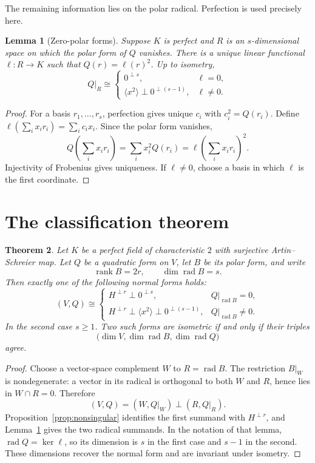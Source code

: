 \documentclass[11pt]{article}
\newtheorem{theorem}{Theorem}[section]
\newtheorem{lemma}[theorem]{Lemma}
\theoremstyle{definition}
\theoremstyle{remark}
\newcommand{\rad}{\operatorname{rad}}
\newcommand{\rank}{\operatorname{rank}}
\begin{document}
The remaining information lies on the polar radical.  Perfection is used
precisely here.

\begin{lemma}[Zero-polar forms]\label{lem:radical}
Suppose $K$ is perfect and $R$ is an $s$-dimensional space on which the polar
form of $Q$ vanishes.  There is a unique linear functional
$\ell:R\to K$ such that $Q(r)=\ell(r)^2$.  Up to isometry,
\[
  Q|_R\cong
  \begin{cases}
    0^{\perp s},&\ell=0,\\
    \langle x^2\rangle\perp0^{\perp(s-1)},&\ell\ne0.
  \end{cases}
\]
\end{lemma}

\begin{proof}
For a basis $r_1,\dots,r_s$, perfection gives unique $c_i$ with
$c_i^2=Q(r_i)$.  Define
$\ell(\sum_i x_i r_i)=\sum_i c_i x_i$.  Since the polar form vanishes,
\[
  Q\left(\sum_i x_i r_i\right)
    =\sum_i x_i^2Q(r_i)
    =\ell\left(\sum_i x_i r_i\right)^2.
\]
Injectivity of Frobenius gives uniqueness.  If $\ell\ne0$, choose a basis in
which $\ell$ is the first coordinate.
\end{proof}

\section{The classification theorem}

\begin{theorem}\label{thm:classification}
Let $K$ be a perfect field of characteristic $2$ with surjective
Artin--Schreier map.  Let $Q$ be a quadratic form on $V$, let $B$ be its
polar form, and write
\[
  \rank B=2r,\qquad \dim\rad B=s.
\]
Then exactly one of the following normal forms holds:
\[
 (V,Q)\cong
 \begin{cases}
  H^{\perp r}\perp0^{\perp s},
    &Q|_{\rad B}=0,\\
  H^{\perp r}\perp\langle x^2\rangle\perp0^{\perp(s-1)},
    &Q|_{\rad B}\ne0.
 \end{cases}
\]
In the second case $s\ge1$.  Two such forms are isometric if and only if
their triples
\[
  \bigl(\dim V,\dim\rad B,\dim\rad Q\bigr)
\]
agree.
\end{theorem}

\begin{proof}
Choose a vector-space complement $W$ to $R=\rad B$.  The restriction
$B|_W$ is nondegenerate: a vector in its radical is orthogonal to both $W$
and $R$, hence lies in $W\cap R=0$.  Therefore
\[
  (V,Q)=(W,Q|_W)\perp(R,Q|_R).
\]
Proposition~\ref{prop:nonsingular} identifies the first summand with
$H^{\perp r}$, and Lemma~\ref{lem:radical} gives the two radical summands.
In the notation of that lemma, $\rad Q=\ker\ell$, so its dimension is $s$
in the first case and $s-1$ in the second.  These dimensions recover the
normal form and are invariant under isometry.
\end{proof}
\end{document}
